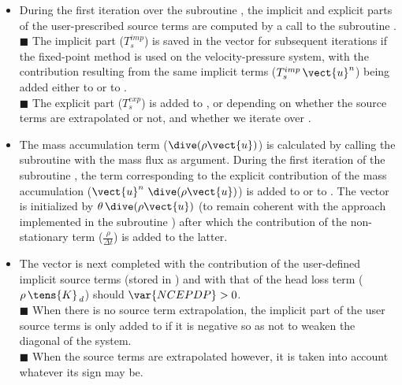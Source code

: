 \begin{itemize}
\item During the first iteration over the subroutine , the implicit and explicit parts of the user-prescribed source terms are computed by a call to the subroutine .\\
{\tiny$\blacksquare$} The implicit part ($T_s^{imp}$) is saved in the vector  for subsequent iterations if the fixed-point method is used on the velocity-pressure system, with the contribution resulting from the same implicit terms ($T_s^{imp}\,\vect{u}^n$) being added either to  or to .\\
{\tiny$\blacksquare$} The explicit part ($T_s^{exp}$) is added to ,  or  depending on whether the source terms are extrapolated or not, and whether we iterate over .\\

\item The mass accumulation term ($\dive(\rho \vect {u})$) is calculated by calling the subroutine  with the mass flux as argument. During the first iteration of the subroutine ,
the term corresponding to the explicit contribution of the mass accumulation ($\vect{u}^{n}\ \dive(\rho \vect{u})$) is added to  or to . The vector  is initialized by $\theta\,\dive(\rho \vect{u})$ (to remain coherent with the approach implemented in the subroutine
) after which the contribution of the non-stationary term ($\displaystyle
\frac{\rho}{\Delta t}$) is added to the latter.\\

\item The vector  is next completed with the contribution of the user-defined implicit source terms (stored in ) and with that of the head loss term ($\rho\,\tens{K}_{\,d}$) should $\var{NCEPDP}>0$.\\
{\tiny$\blacksquare$} When there is no source term extrapolation, the implicit part of the user source terms is  only added to  if it is negative so as not to weaken the diagonal of the system.\\
{\tiny$\blacksquare$} When the source terms are extrapolated however, it is taken into account whatever its sign may be.\\


\end{itemize}
